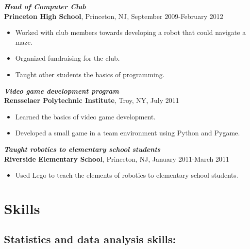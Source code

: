 \documentclass[letterpaper,12pt]{article}
\begin{document}
\textit{\textbf{Head of Computer Club}} \\
\textbf{Princeton High School}, Princeton, NJ, September 2009-February
2012
\begin{itemize}
\item Worked with club members towards developing a robot that could
  navigate a maze.
\item Organized fundraising for the club.
\item Taught other students the basics of programming.
\end{itemize}

\textit{\textbf{Video game development program}} \\
\textbf{Rensselaer Polytechnic Institute}, Troy, NY, July 2011
\begin{itemize}
\item Learned the basics of video game development.
\item Developed a small game in a team environment using Python and
  Pygame.
\end{itemize}

\textit{\textbf{Taught robotics to elementary school students}} \\
\textbf{Riverside Elementary School}, Princeton, NJ, January
2011-March 2011
\begin{itemize}
\item Used Lego to teach the elements of robotics to elementary school
  students.
\end{itemize}

\fi

\section*{Skills}

\subsection*{Statistics and data analysis skills:}
\end{document}
